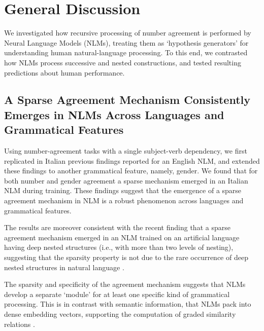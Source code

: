 \section{General Discussion}
We investigated how recursive processing of number agreement is performed by Neural Language Models (NLMs), treating them as `hypothesis generators' for understanding human natural-language processing. To this end, we contrasted how NLMs process successive and nested constructions, and tested resulting predictions about human performance. 

\subsection{A Sparse Agreement Mechanism Consistently Emerges in NLMs Across Languages and Grammatical Features}
Using number-agreement tasks with a single subject-verb dependency, we first replicated in Italian previous findings reported for an English NLM, and extended these findings to another grammatical feature, namely, gender. We found that for both number and gender agreement a sparse mechanism emerged in an Italian NLM during training. These findings suggest that the emergence of a sparse agreement mechanism in NLM is a robust phenomenon across languages and grammatical features. 

The results are moreover consistent with the recent finding that a sparse agreement mechanism emerged in an NLM trained on an artificial language having deep nested structures (i.e., with more than two levels of nesting), suggesting that the sparsity property is not due to the rare occurrence of deep nested structures in natural language \citep{lakretz2020recursion}. 

The sparsity and specificity of the agreement mechanism suggests that NLMs develop a separate `module' for at least one specific kind of grammatical processing. This is in contrast with semantic information, that NLMs pack into dense embedding vectors, supporting the computation of graded similarity relations \citep{Mikolov:etal:2013a,Jurafsky:Martin:2020}.


